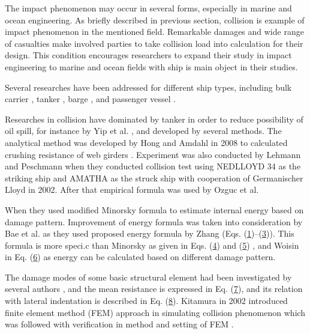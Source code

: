 \documentclass[../Final.tex]{subfiles}
\begin{document}
The impact phenomenon may occur in several forms, espe­cially in marine and ocean engineering. As briefly described in previous section, collision is example of impact phenomenon in the mentioned field. 
Remarkable damages and wide range of casualties make involved parties to take collision load into calculation for their design. 
This condition encourages researchers to expand their study in impact engineering to marine and ocean fields with ship is main object in their studies. 


Several researches have been addressed for different ship types, including bulk carrier \cite{ozguc2005comparative}, tanker \cite{haris2013analysis,bae2016numerical}, barge \cite{leheta2014finite}, and passenger vessel \cite{prabowo2016evaluating,prabowo2016energy,prabowo2017analysis,prabowo2017effects}. 


Researches in collision have dominated by tanker in order to reduce possibility of oil spill, for instance by Yip et al. \cite{yip2011effectiveness}, and developed by several methods. 
The analytical method was developed by Hong and Amdahl in 2008 to calcu­lated crushing resistance of web girders \cite{hong2008crushing}. Experiment was also conducted by Lehmann and Peschmann \cite{lehmann2002energy} 
when they conducted collision test using NEDLLOYD 34 as the striking ship and AMATHA as the struck ship with cooperation of Germanischer Lloyd in 2002. After that empirical formula was used by Ozguc et al. \cite{ozguc2005comparative} 


When they used modified Minorsky formula to estimate internal energy based on damage pattern. Improvement of energy formula was taken into consideration by Bae et al. \cite{bae2016study}
as they used proposed energy formula by Zhang (Eqs. (\hyperref[eq1]{1})–(\hyperref[eq3]{3})). This formula is more speci.c than Minorsky as given in Eqs. (\hyperref[eq4]{4}) and (\hyperref[eq5]{5}) \cite{minorsky1958analysis}, and Woisin in Eq. (\hyperref[eq6]{6}) \cite{woisin1979design} as energy can be calculated based on different damage pattern. 


The damage modes of some basic structural element had been investigated by several authors \cite{paik1995ultimate,lu1990cutting,wierzbicki1993closed,simonsen1997ship,prabowo2017structural}, and the mean resistance is expressed in Eq. (\hyperref[eq7]{7}), and its relation with lateral indentation is described in Eq. (\hyperref[eq8]{8}). Kitamura 
in 2002 introduced finite element method (FEM) approach in simulating collision phenomenon \cite{kitamura2002fem} which was followed with verification in method and setting of FEM \cite{wisniewski2003effect}. 
\end{document}
